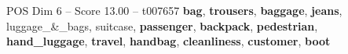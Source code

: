 \begin{textsample}{POS Dim 6 – Score 13.00 – t007657}  \label{ex:f6_pos_019}
\textbf{bag}, \textbf{trousers}, \textbf{baggage}, \textbf{jeans}, luggage\_\&\_bags, suitcase, \textbf{passenger}, \textbf{backpack}, \textbf{pedestrian}, \textbf{hand\_luggage}, \textbf{travel}, \textbf{handbag}, \textbf{cleanliness}, \textbf{customer}, \textbf{boot}

\end{textsample}

